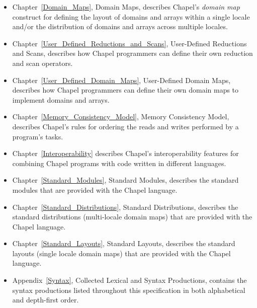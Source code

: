 \begin{itemize}
\item
Chapter~\ref{Domain_Maps}, Domain Maps, describes
Chapel's \emph{domain map} construct for defining the layout of
domains and arrays within a single locale and/or the distribution of
domains and arrays across multiple locales.

\item
Chapter~\ref{User_Defined_Reductions_and_Scans}, User-Defined
Reductions and Scans, describes how Chapel programmers can define
their own reduction and scan operators.

\item
Chapter~\ref{User_Defined_Domain_Maps}, User-Defined Domain Maps,
describes how Chapel programmers can define their own domain maps to
implement domains and arrays.

\item
  Chapter~\ref{Memory_Consistency_Model}, Memory Consistency Model,
  describes Chapel's rules for ordering the reads and writes performed
  by a program's tasks.

\item
Chapter~\ref{Interoperability} describes Chapel's interoperability
features for combining Chapel programs with code written in different
languages.

\item
Chapter~\ref{Standard_Modules}, Standard Modules, describes the
standard modules that are provided with the Chapel language.

\item
Chapter~\ref{Standard_Distributions}, Standard Distributions,
describes the standard distributions (multi-locale domain maps) that
are provided with the Chapel language.

\item
Chapter~\ref{Standard_Layouts}, Standard Layouts, describes the
standard layouts (single locale domain maps) that are provided with
the Chapel language.

\item
Appendix~\ref{Syntax}, Collected Lexical and Syntax Productions,
contains the syntax productions listed throughout this specification
in both alphabetical and depth-first order.

\end{itemize}
